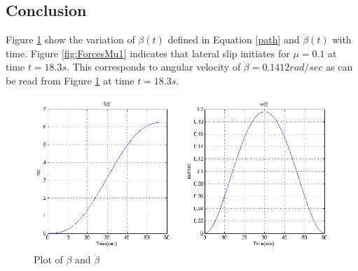 {\subsection{Conclusion}
Figure \ref{fig:beta1} show the variation of $\beta(t)$ defined in Equation \ref{path} and $\dot\beta(t)$ with time.  Figure \ref{fig:ForcesMu1} indicates  that lateral slip initiates for $\mu=0.1$ at time $t=18.3s$. This corresponds to angular velocity of $ \dot \beta =0.1412 rad/sec$ as can be read from Figure \ref{fig:beta1} at time $t=18.3s$.
\begin{figure}
	\centering
	\includegraphics[width=\linewidth]{Chapter4/fig/beta}
	\caption{Plot of $\beta$ and $\dot{\beta}$}
	\label{fig:beta1}
\end{figure}

}
